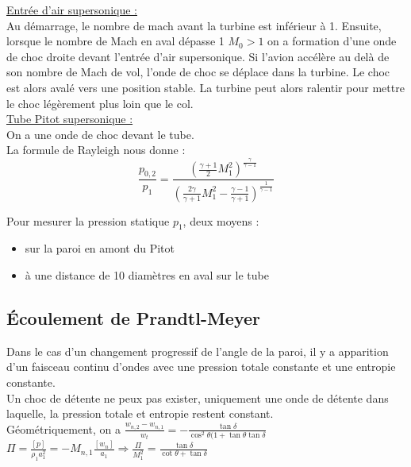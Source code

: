 \documentclass[../main.tex]{subfiles}
\begin{document}
\quad \underline{Entrée d'air supersonique :}\\
Au démarrage, le nombre de mach avant la turbine est inférieur à 1. Ensuite, lorsque le nombre de Mach en aval dépasse 1 $M_0>1$ on a formation d'une onde de choc droite devant l'entrée d'air supersonique. Si l'avion accélère au delà de son nombre de Mach de vol, l'onde de choc se déplace dans la turbine. Le choc est alors avalé vers une position stable. La turbine peut alors ralentir pour mettre le choc légèrement plus loin que le col.\\

\quad \underline{Tube Pitot supersonique :}\\
On a une onde de choc devant le tube.\\

La formule de Rayleigh nous donne : \begin{equation}
    \frac{p_{0,2}}{p_1} = \frac{(\frac{\gamma+1}{2} M_1^2)^{\frac{\gamma}{\gamma-1}}}{(\frac{2\gamma}{\gamma+1} M_1^2 - \frac{\gamma-1}{\gamma+1})^{\frac{1}{\gamma-1}}}
\end{equation}

Pour mesurer la pression statique $p_1$, deux moyens : \begin{itemize}
    \item sur la paroi en amont du Pitot\\
    \item à une distance de 10 diamètres en aval sur le tube\\
\end{itemize}

\subsection{Écoulement de Prandtl-Meyer}
Dans le cas d'un changement progressif de l'angle de la paroi, il y a apparition d'un faisceau continu d'ondes avec une pression totale constante et une entropie constante.\\
Un choc de détente ne peux pas exister, uniquement une onde de détente dans laquelle, la pression totale et entropie restent constant.\\
Géométriquement, on a $ \frac{w_{n,2} - w_{n,1}}{w_t} = - \frac{\tan \delta}{ \cos^2 \theta (1+\tan\theta \tan \delta}$\\
$\Pi = \frac{[p]}{\rho_1 a_1^2} = -M_{n,1} \frac{[w_n]}{a_1} \Rightarrow \frac{\Pi}{M_1^2} = \frac{\tan \delta}{ \cot \theta + \tan \delta}$\\
\end{document}
